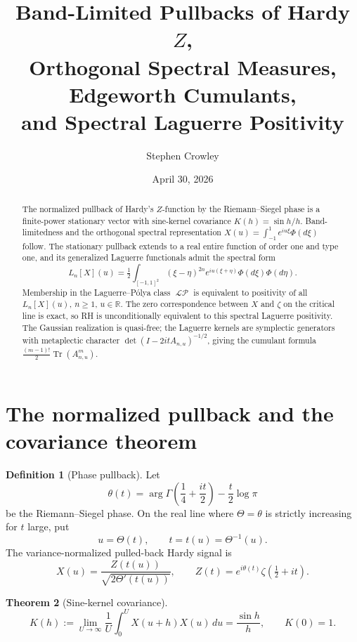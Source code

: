 \documentclass[11pt,reqno]{amsart}
\title[Band-Limited Hardy \(Z\), Edgeworth Cumulants, and Laguerre Positivity]{%
Band-Limited Pullbacks of Hardy \(Z\),\\
Orthogonal Spectral Measures, Edgeworth Cumulants,\\
and Spectral Laguerre Positivity}
\author{Stephen Crowley}
\date{April 30, 2026}
\theoremstyle{plain}
\newtheorem{theorem}{Theorem}[section]
\theoremstyle{definition}
\newtheorem{definition}[theorem]{Definition}
\theoremstyle{remark}
\DeclareMathOperator{\Tr}{Tr}
\DeclareMathOperator{\LP}{\mathcal{LP}}
\newcommand{\R}{\mathbb R}
\begin{document}
\begin{abstract}
The normalized pullback of Hardy's \(Z\)-function by the Riemann--Siegel
phase is a finite-power stationary vector with sine-kernel covariance
\(K(h)=\sin h/h\). Band-limitedness and the orthogonal spectral
representation \(X(u)=\int_{-1}^{1}e^{iu\xi}\Phi(d\xi)\) follow. The
stationary pullback extends to a real entire function of order one and
type one, and its generalized Laguerre functionals admit the spectral form
\[
L_n[X](u)=\tfrac12\int_{[-1,1]^2}(\xi-\eta)^{2n}e^{iu(\xi+\eta)}
\Phi(d\xi)\Phi(d\eta).
\]
Membership in the Laguerre--P\'olya class \(\LP\) is equivalent to
positivity of all \(L_n[X](u)\), \(n\ge1\), \(u\in\R\). The zero
correspondence between \(X\) and \(\zeta\) on the critical line is exact,
so RH is unconditionally equivalent to this spectral Laguerre positivity.
The Gaussian realization is quasi-free; the Laguerre kernels are symplectic
generators with metaplectic character
\(\det(I-2itA_{n,u})^{-1/2}\), giving the cumulant formula
\(\tfrac{(m-1)!}{2}\Tr(A_{n,u}^m)\).
\end{abstract}

\maketitle

\section{The normalized pullback and the covariance theorem}

\begin{definition}[Phase pullback]
Let
\[
\theta(t)=\arg\Gamma\!\left(\frac14+\frac{it}{2}\right)-\frac t2\log\pi
\]
be the Riemann--Siegel phase. On the real line where \(\Theta=\theta\) is
strictly increasing for \(t\) large, put
\[
u=\Theta(t),\qquad t=t(u)=\Theta^{-1}(u).
\]
The variance-normalized pulled-back Hardy signal is
\[
X(u)=\frac{Z(t(u))}{\sqrt{2\Theta'(t(u))}},
\qquad
Z(t)=e^{i\theta(t)}\zeta\!\left(\tfrac12+it\right).
\]
\end{definition}

\begin{theorem}[Sine-kernel covariance]\label{thm:sine}
\[
K(h):=\lim_{U\to\infty}\frac1U\int_0^U X(u+h)X(u)\,du=\frac{\sin h}{h},
\qquad K(0)=1.
\]
\end{theorem}
\end{document}
